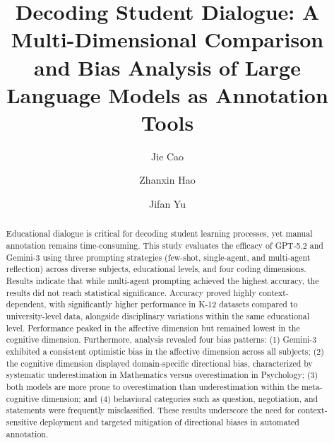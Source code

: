 \documentclass[runningheads]{llncs}
\begin{document}
%
\title{Decoding Student Dialogue: A Multi-Dimensional Comparison and Bias Analysis of Large Language Models as Annotation Tools}
%
%
 \author{Jie Cao\and
Zhanxin Hao \and
Jifan Yu}
%
\maketitle              %
%
\begin{abstract}
Educational dialogue is critical for decoding student learning processes, yet manual annotation remains time-consuming. This study evaluates the efficacy of GPT-5.2 and Gemini-3 using three prompting strategies (few-shot, single-agent, and multi-agent reflection) across diverse subjects, educational levels, and four coding dimensions. Results indicate that while multi-agent prompting achieved the highest accuracy, the results did not reach statistical significance. Accuracy proved highly context-dependent, with significantly higher performance in K-12 datasets compared to university-level data, alongside disciplinary variations within the same educational level. Performance peaked in the affective dimension but remained lowest in the cognitive dimension. Furthermore, analysis revealed four bias patterns: (1) Gemini-3 exhibited a consistent optimistic bias in the affective dimension across all subjects; (2) the cognitive dimension displayed domain-specific directional bias, characterized by systematic underestimation in Mathematics versus overestimation in Psychology; (3) both models are more prone to overestimation than underestimation within the meta-cognitive dimension; and (4) behavioral categories such as question, negotiation, and statements were frequently misclassified. These results underscore the need for context-sensitive deployment and targeted mitigation of directional biases in automated annotation.

\end{abstract}
\end{document}
